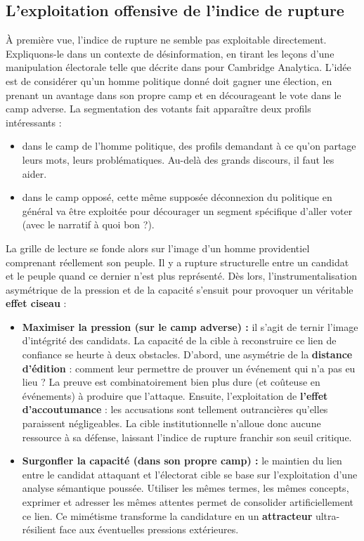 \documentclass{report}
\begin{document}
	\subsection*{L'exploitation offensive de l'indice de rupture}
	
	À première vue, l'indice de rupture ne semble pas exploitable directement. Expliquons-le dans un contexte de désinformation, en tirant les leçons d'une manipulation électorale telle que décrite dans \cite{Wylie2020} pour Cambridge Analytica. L'idée est de considérer qu'un homme politique donné doit gagner une élection, en prenant un avantage dans son propre camp et en décourageant le vote dans le camp adverse. La segmentation des votants fait apparaître deux profils intéressants : 
	\begin{itemize}
		\item dans le camp de l'homme politique, des profils demandant à ce qu'on partage leurs mots, leurs problématiques. Au-delà des grands discours, il faut les aider. 
		\item dans le camp opposé, cette même supposée déconnexion du politique en général va être exploitée pour décourager un segment spécifique d'aller voter (avec le narratif \og{}à quoi bon ?\fg{}).
	\end{itemize}
	
	La grille de lecture se fonde alors sur l'image d'un homme providentiel comprenant réellement son peuple. Il y a rupture structurelle entre un candidat et le peuple quand ce dernier n'est plus représenté. Dès lors, l'instrumentalisation asymétrique de la pression et de la capacité s'ensuit pour provoquer un véritable \textbf{effet ciseau} : 
	\begin{itemize}
		\item \textbf{Maximiser la pression (sur le camp adverse) :} il s'agit de ternir l'image d'intégrité des candidats. La capacité de la cible à reconstruire ce lien de confiance se heurte à deux obstacles. D'abord, une asymétrie de la \textbf{distance d'édition} : comment leur permettre de prouver un événement qui n'a pas eu lieu ? La preuve est combinatoirement bien plus dure (et coûteuse en événements) à produire que l'attaque. Ensuite, l'exploitation de \textbf{l'effet d'accoutumance} : les accusations sont tellement outrancières qu'elles paraissent négligeables. La cible institutionnelle n'alloue donc aucune ressource à sa défense, laissant l'indice de rupture franchir son seuil critique.
		\item \textbf{Surgonfler la capacité (dans son propre camp) :} le maintien du lien entre le candidat attaquant et l'électorat cible se base sur l'exploitation d'une analyse sémantique poussée. Utiliser les mêmes termes, les mêmes concepts, exprimer et adresser les mêmes attentes permet de consolider artificiellement ce lien. Ce mimétisme transforme la candidature en un \textbf{attracteur} ultra-résilient face aux éventuelles pressions extérieures.
	\end{itemize}
	
\end{document}
